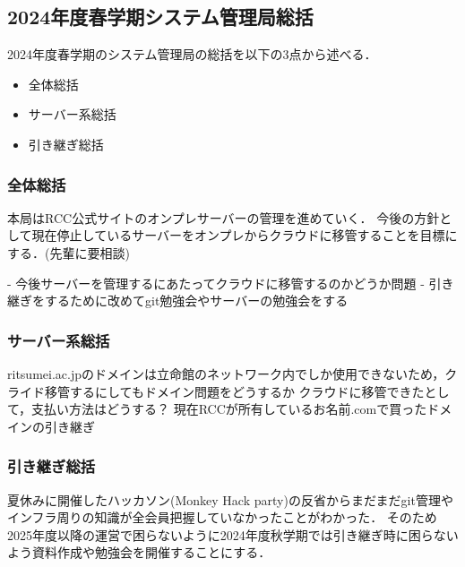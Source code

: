 \subsection*{2024年度春学期システム管理局総括}


2024年度春学期のシステム管理局の総括を以下の3点から述べる．
\begin{itemize}
    \item 全体総括
    \item サーバー系総括
    \item 引き継ぎ総括
\end{itemize}

\subsubsection*{全体総括}
本局はRCC公式サイトのオンプレサーバーの管理を進めていく．
今後の方針として現在停止しているサーバーをオンプレからクラウドに移管することを目標にする．(先輩に要相談)

- 今後サーバーを管理するにあたってクラウドに移管するのかどうか問題
- 引き継ぎをするために改めてgit勉強会やサーバーの勉強会をする

\subsubsection*{サーバー系総括}
ritsumei.ac.jpのドメインは立命館のネットワーク内でしか使用できないため，クライド移管するにしてもドメイン問題をどうするか
クラウドに移管できたとして，支払い方法はどうする？
現在RCCが所有しているお名前.comで買ったドメインの引き継ぎ

\subsubsection*{引き継ぎ総括}
夏休みに開催したハッカソン(Monkey Hack party)の反省からまだまだgit管理やインフラ周りの知識が全会員把握していなかったことがわかった．
そのため2025年度以降の運営で困らないように2024年度秋学期では引き継ぎ時に困らないよう資料作成や勉強会を開催することにする．

